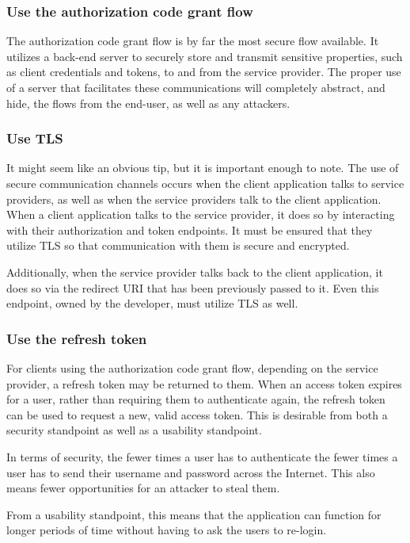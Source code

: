 \subsubsection{Use the authorization code grant flow}
The authorization code grant flow is by far the most secure flow available. It utilizes a back-end server to securely store and transmit sensitive properties, such as client credentials and tokens, to and from the service provider.
The proper use of a server that facilitates these communications will completely abstract, and hide, the flows from the end-user, as well as any attackers.

\subsubsection{Use TLS}
It might seem like an obvious tip, but it is important enough to note. The use of secure communication channels occurs when the client application talks to service providers, as well as when the service providers talk to the client application. When a client application talks to the service provider, it does so by interacting with their authorization and token endpoints. It must be ensured that they utilize TLS so that communication with them is secure and encrypted.

Additionally, when the service provider talks back to the client application, it does so via the redirect URI that has been previously passed to it. Even this endpoint, owned by the developer, must utilize TLS as well.

\subsubsection{Use the refresh token}
For clients using the authorization code grant flow, depending on the service provider, a refresh token may be returned to them. When an access token expires for a user, rather than requiring them to authenticate again, the refresh token can be used to request a new, valid access token. This is desirable from both a security standpoint as well as a usability standpoint.

In terms of security, the fewer times a user has to authenticate the fewer times a user has to send their username and password across the Internet. This also means fewer opportunities for an attacker to steal them.

From a usability standpoint, this means that the application can function for longer periods of time without having to ask the users to re-login.


